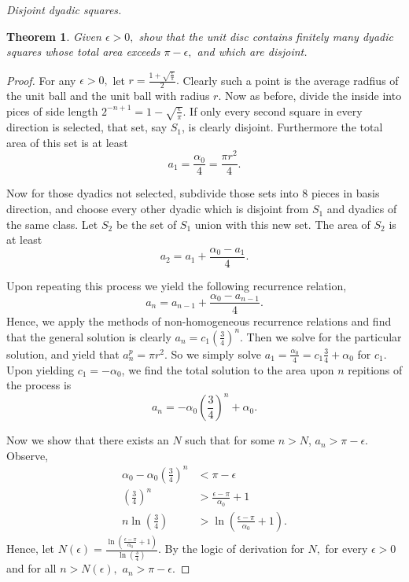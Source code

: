 \documentclass[letter]{article}
\newtheorem{theorem}{Theorem}
\newenvironment{menumerate}{%
  \edef\backupindent{\the\parindent}%
  \enumerate%
  \setlength{\parindent}{\backupindent}%
}{\endenumerate}
\begin{document}
\begin{menumerate}
\begin{menumerate}
			\item \textit{Disjoint dyadic squares.}
				\begin{theorem}
				Given $\epsilon > 0,$ show that the unit disc contains finitely many dyadic squares whose total area exceeds $\pi - \epsilon,$ and which are disjoint.
				\end{theorem}

				\begin{proof}
				 	For any $\epsilon > 0,$ let $r = \frac{1+\sqrt{\frac{\epsilon}{\pi}}}{2}.$ Clearly such a point is the average radfius of the unit ball and the unit ball with radius $r.$ Now as before, divide the inside into pices of side length $2^{-n+1} = 1 - \sqrt{\frac{\epsilon}{\pi}}. $ If only every second square in every direction is selected, that set, say $S_1$, is clearly disjoint. Furthermore the total area of this set is at least $$a_1 = \frac{\alpha_0}{4} = \frac{\pi r^2}{4}.$$

				 	Now for those dyadics not selected, subdivide those sets into $8$ pieces in basis direction, and choose every other dyadic which is disjoint from $S_1$ and dyadics of the same class. Let $S_2$ be the set of $S_1$ union with this new set. The area of $S_2$ is at least  
				 	$$a_2 = a_1 + \frac{\alpha_0-a_1}{4}.$$

				 	Upon repeating this process we yield the following recurrence relation, $$a_n = a_{n-1} + \frac{\alpha_0-a_{n-1}}{4}.$$ Hence, we apply the methods of non-homogeneous recurrence relations and find that the general solution is clearly $a_n = c_1\left(\frac34\right)^n$. Then we solve for the particular solution, and yield that $a_n^p = \pi r^2.$ So we simply solve $a_1 = \frac{\alpha_0}{4}=c_1\frac34 + \alpha_0$ for $c_1.$ Upon yielding $c_1 = -\alpha_0$, we find the total solution to the area upon $n$ repitions of the process is 
				 	$$a_n = -\alpha_0\left(\frac34\right)^n + \alpha_0.$$

				 	Now we show that there exists an $N$ such that for some $n > N$, $a_n > \pi - \epsilon.$ Observe, \begin{equation}
				 		\begin{aligned}
				 			\alpha_0 - \alpha_0\left(\frac34\right)^n &< \pi - \epsilon \\
				 			 \left(\frac34\right)^n &> \frac{\epsilon-\pi}{\alpha_0} + 1 \\
				 			 	n \ln\left(\frac34\right) &> \ln\left(\frac{\epsilon-\pi}{\alpha_0} + 1\right).
				 		\end{aligned}
				 	\end{equation} Hence, let $N(\epsilon) = \frac{\ln\left(\frac{\epsilon-\pi}{\alpha_0} + 1\right)}{\ln\left(\frac34\right)} $. By the logic of derivation for $N,$ for every $\epsilon > 0$ and for all $n > N(\epsilon),$ $a_n > \pi - \epsilon.$ 


\end{proof}
\end{menumerate}
\end{menumerate}
\end{document}
